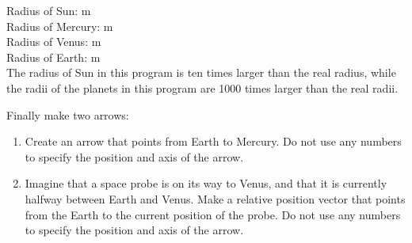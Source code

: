 \begin{enumerate}
Radius of Sun:  m\\
Radius of Mercury:   m\\
Radius of Venus:  m\\
Radius of Earth:  m\\

The radius of Sun in this program is ten times larger than the real radius, while the radii of the planets in this program are 1000 times larger than the real radii.

Finally make two arrows:

\begin{enumerate}
	\item Create an arrow that points from Earth to Mercury. Do not use any numbers to specify the position and axis of the arrow.
	\item Imagine that a space probe is on its way to Venus, and that it is currently halfway between Earth and Venus.  Make a relative position vector that points from the Earth to the current position of the probe. Do not use any numbers to specify the position and axis of the arrow.
\end{enumerate}

\end{enumerate}